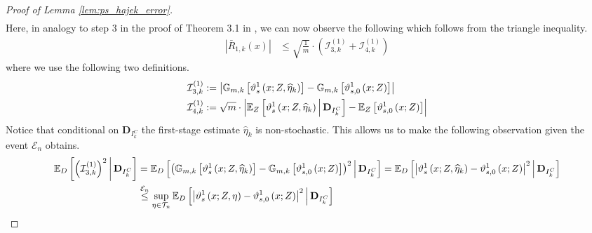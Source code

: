 \begin{proof}[Proof of Lemma \ref{lem:ps_hajek_error}]
\begin{equation}
\begin{aligned}
        \end{aligned}
    \end{equation}
    Here, in analogy to step 3 in the proof of Theorem 3.1 in \citet{chernozhukov_doubledebiased_2018}, we can now observe the following which follows from the triangle inequality.
    \begin{equation}
        \begin{aligned}
            \left|\bar{R}_{1, k}\left(x\right)\right|
            & \leq \sqrt{\frac{1}{m}} \cdot \left(\mathcal{I}_{3,k}^{(1)} + \mathcal{I}_{4,k}^{(1)}\right)
        \end{aligned}
    \end{equation}
    where we use the following two definitions.
    \begin{align}
        \mathcal{I}_{3,k}^{(1)} 
        & := \left|\mathbb{G}_{m,k}\left[\vartheta_{s}^{1}\left(x; Z, \widehat{\eta}_{k}\right)\right] 
        - \mathbb{G}_{m,k}\left[\vartheta_{s,0}^{1}\left(x; Z\right) \right]\right|\\
        \mathcal{I}_{4,k}^{(1)} 
        & := \sqrt{m} \cdot \left|
        \mathbb{E}_{Z}\left[\vartheta_{s}^{1}\left(x; Z, \widehat{\eta}_{k}\right) \, \middle| \, \mathbf{D}_{I_{k}^{C}}\right]
        - \mathbb{E}_{Z}\left[\vartheta_{s,0}^{1}\left(x; Z\right) \right]\right|
    \end{align}
    Notice that conditional on $\mathbf{D}_{I_{k}^{C}}$ the first-stage estimate $\hat{\eta}_{k}$ is non-stochastic.
    This allows us to make the following observation given the event $\mathcal{E}_{n}$ obtains.
    \begin{equation}
        \begin{aligned}
            \E_{D}\left[\left(\mathcal{I}_{3,k}^{(1)}\right)^{2} \, \middle| \, \mathbf{D}_{I_{k}^{C}}\right] 
            & = \E_{D}\left[ \left(\mathbb{G}_{m,k}\left[\vartheta_{s}^{1}\left(x; Z, \hat{\eta}_{k}\right)\right] 
            - \mathbb{G}_{m,k}\left[\vartheta_{s,0}^{1}\left(x; Z\right)\right]\right)^{2} \, \middle| \, \mathbf{D}_{I_{k}^{C}}\right]
            = \E_{D}\left[\left|\vartheta_{s}^{1}\left(x; Z, \hat{\eta}_{k}\right) - \vartheta_{s,0}^{1}\left(x; Z\right)\right|^{2}
            \, \middle| \, \mathbf{D}_{I_{k}^{C}}\right]\\
            & \overset{\mathcal{E}_{n}}{\leq} \sup_{\eta \in \mathcal{T}_{n}} 
             \E_{D}\left[\left|\vartheta_{s}^{1}\left(x; Z, \eta\right) - \vartheta_{s,0}^{1}\left(x; Z\right)\right|^{2}
            \, \middle| \, \mathbf{D}_{I_{k}^{C}}\right]\\

\end{aligned}
\end{equation}
\end{proof}
